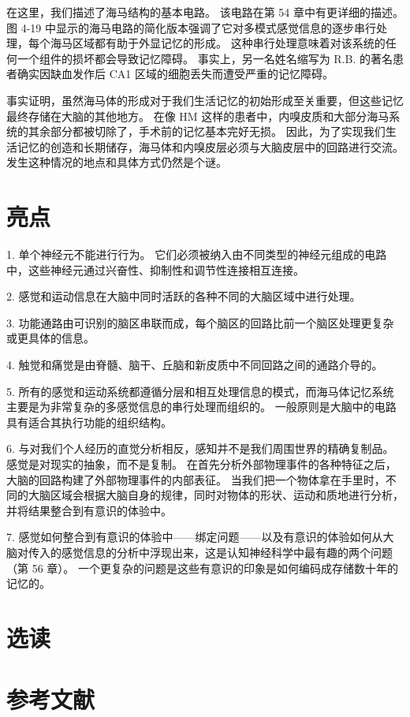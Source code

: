 在这里，我们描述了海马结构的基本电路。 该电路在第 54 章中有更详细的描述。图 4-19 中显示的海马电路的简化版本强调了它对多模式感觉信息的逐步串行处理，每个海马区域都有助于外显记忆的形成。 这种串行处理意味着对该系统的任何一个组件的损坏都会导致记忆障碍。 事实上，另一名姓名缩写为 R.B. 的著名患者确实因缺血发作后 CA1 区域的细胞丢失而遭受严重的记忆障碍。

事实证明，虽然海马体的形成对于我们生活记忆的初始形成至关重要，但这些记忆最终存储在大脑的其他地方。 在像 HM 这样的患者中，内嗅皮质和大部分海马系统的其余部分都被切除了，手术前的记忆基本完好无损。 因此，为了实现我们生活记忆的创造和长期储存，海马体和内嗅皮层必须与大脑皮层中的回路进行交流。 发生这种情况的地点和具体方式仍然是个谜。


\section{亮点}

1. 单个神经元不能进行行为。 它们必须被纳入由不同类型的神经元组成的电路中，这些神经元通过兴奋性、抑制性和调节性连接相互连接。

2. 感觉和运动信息在大脑中同时活跃的各种不同的大脑区域中进行处理。

3. 功能通路由可识别的脑区串联而成，每个脑区的回路比前一个脑区处理更复杂或更具体的信息。

4. 触觉和痛觉是由脊髓、脑干、丘脑和新皮质中不同回路之间的通路介导的。 

5. 所有的感觉和运动系统都遵循分层和相互处理信息的模式，而海马体记忆系统主要是为非常复杂的多感觉信息的串行处理而组织的。 一般原则是大脑中的电路具有适合其执行功能的组织结构。 

6. 与对我们个人经历的直觉分析相反，感知并不是我们周围世界的精确复制品。 感觉是对现实的抽象，而不是复制。 在首先分析外部物理事件的各种特征之后，大脑的回路构建了外部物理事件的内部表征。 当我们把一个物体拿在手里时，不同的大脑区域会根据大脑自身的规律，同时对物体的形状、运动和质地进行分析，并将结果整合到有意识的体验中。 

7. 感觉如何整合到有意识的体验中——绑定问题——以及有意识的体验如何从大脑对传入的感觉信息的分析中浮现出来，这是认知神经科学中最有趣的两个问题（第 56 章）。 一个更复杂的问题是这些有意识的印象是如何编码成存储数十年的记忆的。

\section{选读}
\section{参考文献}
























